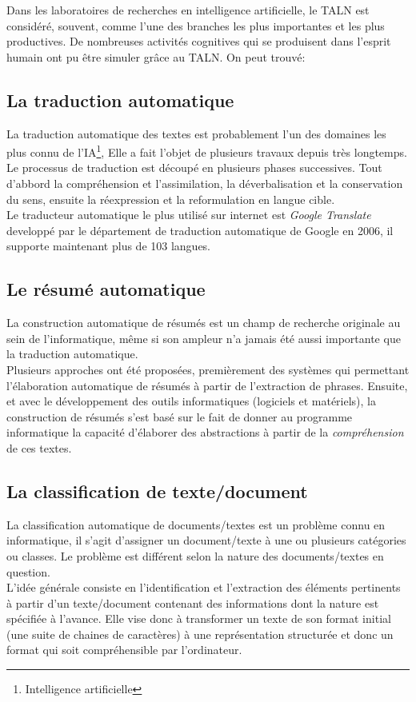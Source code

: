 \documentclass{report}
\begin{document}
Dans les laboratoires de recherches en intelligence artificielle, le TALN est considéré, souvent, comme l'une des branches les plus importantes et les plus productives. De nombreuses activités cognitives qui se produisent dans l'esprit humain ont pu être simuler grâce au TALN.
On peut trouvé: 

    \subsection*{La traduction automatique}
    La traduction automatique des textes est probablement l'un des domaines les plus connu de l'IA\footnote{Intelligence artificielle}, Elle a fait l'objet de plusieurs travaux depuis très longtemps. Le processus de traduction est découpé en plusieurs phases successives. Tout d'abbord la compréhension et l'assimilation, la déverbalisation et la conservation du sens, ensuite la réexpression et la reformulation en langue cible.\\
    Le traducteur automatique le plus utilisé sur internet est \emph{Google Translate} developpé par le département de traduction automatique de Google en 2006, il supporte maintenant plus de 103 langues.\\  

    \subsection*{Le résumé automatique}
    La construction automatique de résumés est un champ de recherche originale au sein de l'informatique, même si son ampleur n'a jamais été aussi importante que la traduction automatique.\\
    Plusieurs approches ont été proposées, premièrement des systèmes qui permettant l'élaboration automatique de résumés à partir de l'extraction de phrases. Ensuite, et avec le développement des outils informatiques (logiciels et matériels), la construction de résumés s'est basé sur le fait de donner au programme informatique la capacité d'élaborer des abstractions à partir de la \emph{compréhension} de ces textes.\\

    \subsection*{La classification de texte/document}
    La classification automatique de documents/textes est un problème connu en informatique, il s'agit d'assigner un document/texte à une ou plusieurs catégories ou classes. Le problème est différent selon la nature des documents/textes en question.\\
    L'idée générale consiste en l'identification et l'extraction des éléments pertinents à partir d'un texte/document contenant des informations dont la nature est spécifiée à l'avance. Elle vise donc à transformer un texte de son format initial (une suite de chaines de caractères) à une représentation structurée et donc un format qui soit compréhensible par l'ordinateur.\\
\end{document}
